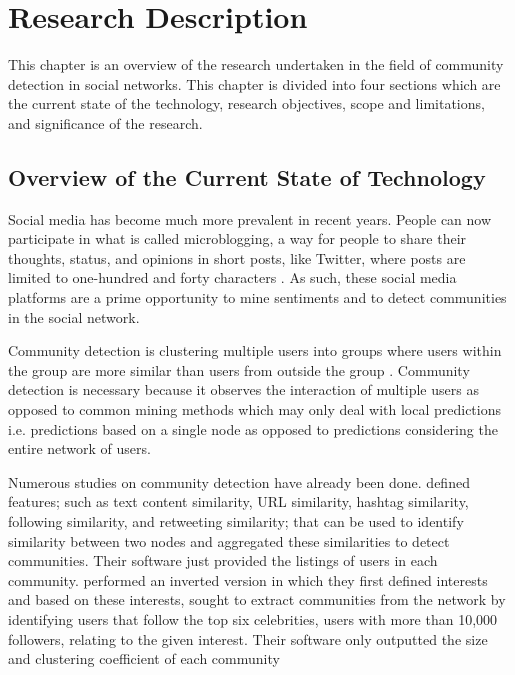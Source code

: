 %
%
%                 

\chapter{Research Description}
\label{sec:researchdesc}

This chapter is an overview of the research undertaken in the field of community detection in social networks. 
This chapter is divided into four sections which are the current state of the technology, research objectives, scope and limitations, and significance of the research.

\section{Overview of the Current State of Technology}
\label{sec:overview}

Social media has become much more prevalent in recent years. People can now participate in what is called microblogging, a way for people to share their thoughts, status, and opinions in short posts, like Twitter, where posts are limited to one-hundred and forty characters \cite{Java:2007}. As such, these social media platforms are a prime opportunity to mine sentiments and to detect communities in the social network. 

Community detection is clustering multiple users into groups where users within the group are more similar than users from outside the group \cite{Tang:2010}. Community detection is necessary because it observes the interaction of multiple users as opposed to common mining methods which may only deal with local predictions i.e. predictions based on a single node as opposed to predictions considering the entire network of users. 

Numerous studies on community detection have already been done.  defined features; such as text content similarity, URL similarity, hashtag similarity, following similarity, and retweeting similarity; that can be used to identify similarity between two nodes and aggregated these similarities to detect communities. Their software just provided the listings of users in each community.  performed an inverted version in which they first defined interests and based on these interests, sought to extract communities from the network by identifying users that follow the top six celebrities, users with more than 10,000 followers, relating to the given interest. Their software only outputted the size and clustering coefficient of each community 

